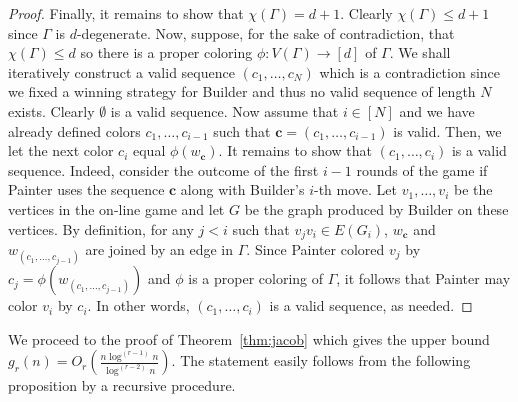 \documentclass[10pt]{amsart}
\theoremstyle{definition}
\begin{document}
\begin{proof}
    Finally, it remains to show that $\chi(\Gamma) = d+1$. Clearly $\chi(\Gamma) \le d+1$ since $\Gamma$ is $d$-degenerate. Now, suppose, for the sake of contradiction, that $\chi(\Gamma) \le d$ so there is a proper coloring $\phi \colon V(\Gamma) \rightarrow [d]$ of $\Gamma$. We shall iteratively construct a valid sequence $(c_1, \dots, c_N)$ which is a contradiction since we fixed a winning strategy for Builder and thus no valid sequence of length $N$ exists. Clearly $\emptyset$ is a valid sequence. Now assume that $i \in [N]$ and we have already defined colors $c_1, \dots, c_{i-1}$ such that $\mathbf{c} = (c_1, \dots, c_{i-1})$ is valid. Then, we let the next color $c_i$ equal $\phi(w_\mathbf{c})$. It remains to show that $(c_1, \dots, c_i)$ is a valid sequence. Indeed, consider the outcome of the first $i-1$ rounds of the game if Painter uses the sequence $\mathbf{c}$ along with Builder's $i$-th move. Let $v_1, \dots, v_i$ be the vertices in the on-line game and let $G$ be the graph produced by Builder on these vertices. By definition, for any $j < i$ such that $v_jv_i \in E(G_i)$, $w_\mathbf{c}$ and $w_{(c_1, \dots, c_{j-1})}$ are joined by an edge in $\Gamma$. Since Painter colored $v_j$ by $c_j = \phi(w_{(c_1, \dots, c_{j-1})})$ and $\phi$ is a proper coloring of $\Gamma$, it follows that Painter may color $v_i$ by $c_i$. In other words, $(c_1, \dots, c_i)$ is a valid sequence, as needed.    
\end{proof}

We proceed to the proof of Theorem~\ref{thm:jacob} which gives the upper bound $g_r(n) = O_r\left(\frac{n \log^{(r-1)} n}{\log^{(r-2)} n}\right).$ The statement easily follows from the following proposition by a recursive procedure.  
\end{document}
